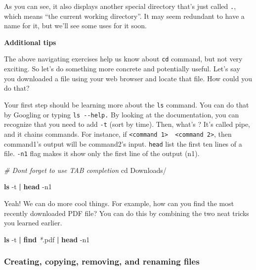 \documentclass[
]{book}
\newenvironment{Shaded}{\begin{snugshade}}{\end{snugshade}}
\newcommand{\AttributeTok}[1]{\textcolor[rgb]{0.13,0.29,0.53}{#1}}
\newcommand{\BuiltInTok}[1]{#1}
\newcommand{\CommentTok}[1]{\textcolor[rgb]{0.56,0.35,0.01}{\textit{#1}}}
\newcommand{\FunctionTok}[1]{\textcolor[rgb]{0.13,0.29,0.53}{\textbf{#1}}}
\newcommand{\KeywordTok}[1]{\textcolor[rgb]{0.13,0.29,0.53}{\textbf{#1}}}
\newcommand{\NormalTok}[1]{#1}
\newcommand{\PreprocessorTok}[1]{\textcolor[rgb]{0.56,0.35,0.01}{\textit{#1}}}
\begin{document}
As you can see, it also displays another special directory that's just called \texttt{.}, which means ``the current working directory''. It may seem redundant to have a name for it, but we'll see some uses for it soon.

\textbf{Additional tips}

The above navigating exercises help us know about \texttt{cd} command, but not very exciting. So let's do something more concrete and potentially useful. Let's say you downloaded a file using your web browser and locate that file. How could you do that?

Your first step should be learning more about the \texttt{ls} command. You can do that by Googling or typing \texttt{ls\ -\/-help.} By looking at the documentation, you can recognize that you need to add \texttt{-t} (sort by time). Then, what's \texttt{\textbar{}}? It's called pipe, and it chains commands. For instance, if \texttt{\textless{}command\ 1\textgreater{}\ \textbar{}\ \textless{}command\ 2\textgreater{}}, then command1's output will be command2's input. \texttt{head} list the first ten lines of a file. \texttt{-n1} flag makes it show only the first line of the output (n1).

\begin{Shaded}
\begin{Highlighting}[]
\CommentTok{\# Don\textquotesingle{}t forget to use TAB completion}
\BuiltInTok{cd}\NormalTok{ Downloads/}

\FunctionTok{ls} \AttributeTok{{-}t} \KeywordTok{|} \FunctionTok{head} \AttributeTok{{-}n1}
\end{Highlighting}
\end{Shaded}

Yeah! We can do more cool things. For example, how can you find the most recently downloaded PDF file? You can do this by combining the two neat tricks you learned earlier.

\begin{Shaded}
\begin{Highlighting}[]
\FunctionTok{ls} \AttributeTok{{-}t} \KeywordTok{|} \FunctionTok{find} \PreprocessorTok{*}\NormalTok{.pdf }\KeywordTok{|} \FunctionTok{head} \AttributeTok{{-}n1}
\end{Highlighting}
\end{Shaded}

\subsubsection{Creating, copying, removing, and renaming files}\label{creating-copying-removing-and-renaming-files}
\end{document}

